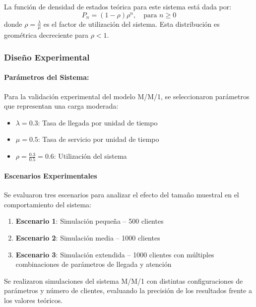 \documentclass{article}
\begin{document}
La función de densidad de estados teórica para este sistema está dada por:
\begin{equation}
    P_n = (1 - \rho)\rho^n, \quad \text{para } n \geq 0
\end{equation}
donde $\rho = \frac{\lambda}{\mu}$ es el factor de utilización del sistema. Esta distribución es geométrica decreciente para $\rho < 1$.

\subsubsection{Diseño Experimental}

\paragraph{Parámetros del Sistema:}

Para la validación experimental del modelo M/M/1, se seleccionaron parámetros que representan una carga moderada:
\begin{itemize}
    \item $\lambda = 0.3$: Tasa de llegada por unidad de tiempo
    \item $\mu = 0.5$: Tasa de servicio por unidad de tiempo
    \item $\rho = \frac{0.3}{0.5} = 0.6$: Utilización del sistema
\end{itemize}

\paragraph{Escenarios Experimentales}

Se evaluaron tres escenarios para analizar el efecto del tamaño muestral en el comportamiento del sistema:

\begin{enumerate}
    \item \textbf{Escenario 1}: Simulación pequeña – 500 clientes
    \item \textbf{Escenario 2}: Simulación media – 1000 clientes
    \item \textbf{Escenario 3}: Simulación extendida – 1000 clientes con múltiples combinaciones de parámetros de llegada y atención
\end{enumerate}

Se realizaron simulaciones del sistema M/M/1 con distintas configuraciones de parámetros y número de clientes, evaluando la precisión de los resultados frente a los valores teóricos.
\end{document}
